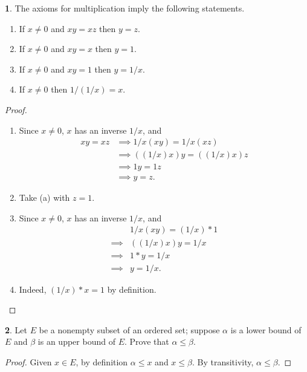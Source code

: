 \documentclass[12pt]{article}
\theoremstyle{definition}
\newtheorem{ex}{}
\begin{document}
\begin{ex}
	The axioms for multiplication imply the following statements.
	\begin{enumerate}[label=(\alph*)]
		\item If $x \neq 0$ and $xy = xz$ then $y = z$.
		\item If $x \neq 0$ and $xy = x$ then $y = 1$.
		\item If $x \neq 0$ and $xy = 1$ then $y = 1/x$.
		\item If $x \neq 0$ then $1/(1/x) = x$.
	\end{enumerate}
\end{ex}
\begin{proof}\
	\begin{enumerate}[label=(\alph*)]
		\item Since $x \neq 0$, $x $ has an inverse $1/x$, and \begin{align*}
			      xy = xz & \implies 1/x(xy) = 1/x(xz)     \\
			              & \implies ((1/x)x)y = ((1/x)x)z \\
			              & \implies 1y = 1z               \\
			              & \implies y = z.
		      \end{align*}
		\item Take (a) with $z = 1$.
		\item Since $x \neq 0$, $x$ has an inverse $1/x$, and \begin{align*}
			               & 1/x(xy) = (1/x)*1 \\
			      \implies & ((1/x)x)y = 1/x   \\
			      \implies & 1 * y = 1/x       \\
			      \implies & y = 1/x.
		      \end{align*}
		\item Indeed, $(1/x) * x = 1$ by definition.
	\end{enumerate}
\end{proof}

\begin{ex}
	Let $E$ be a nonempty subset of an ordered set; suppose $\alpha$ is a lower bound of $E$ and $\beta$ is an upper bound of $E$.
	Prove that $\alpha \leq \beta$.
\end{ex}
\begin{proof}
	Given $x \in E$, by definition $\alpha \leq x$ and $x \leq \beta$.
	By transitivity, $\alpha \leq \beta$.
\end{proof}
\end{document}
